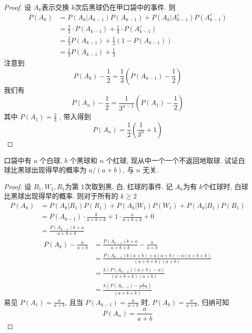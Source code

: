 \documentclass[../main.tex]{subfiles}
\begin{document}
\begin{proof}
    设 \(  A_{k}  \)表示交换 \(  k  \)次后黑球仍在甲口袋中的事件. 则 \[
   \begin{aligned}
    P\left( A_{k} \right)&= P\left( A_{k}|A_{k-1} \right)P\left( A_{k-1} \right)+ P\left( A_{k}|A_{k-1}^{c} \right)P\left( A_{k-1}^{c} \right)\\ 
     &=  \frac{2 }{3 }\cdot P\left( A_{k-1} \right)  + \frac{1 }{3 }\cdot P\left( A_{k-1}^{c} \right)  \\ 
      &= \frac{2 }{3 }P\left( A_{k-1} \right)+ \frac{1 }{3 }\left( 1-P\left( A_{k-1} \right)  \right)    \\ 
       &= \frac{1 }{3 }P\left( A_{k-1} \right)+ \frac{1 }{3 }   
   \end{aligned}     
    \]  注意到 \[
    P\left( A_{k} \right)-\frac{1 }{2 } =  \frac{1 }{3 }\left( P\left( A_{k-1} \right)-\frac{1 }{2}   \right)    
    \]我们有 \[
    P\left( A_{n} \right)-\frac{1 }{2 }= \frac{1 }{3^{n-1} }\left( P\left( A_{1} \right)-\frac{1 }{2 }   \right)    
    \]其中 \(  P\left( A_1 \right)= \frac{2 }{3 }    \) , 带入得到 \[
    P\left( A_{n} \right)=\frac{1 }{2 }\left( \frac{1 }{3^{n} }+ 1  \right)  
    \]
\end{proof}
\begin{exercise}{}{}
口袋中有 $a$ 个白球, $b$ 个黑球和 $n$ 个红球, 现从中一个一个不返回地取球. 试证白球比黑球出现得早的概率为 $a/(a+b)$, 与 $n$ 无关.
\end{exercise}

\begin{proof}
    设 \(  B_{1}, W_{1},R_{1}  \)为第 \(  1  \)次取到黑, 白, 红球的事件. 记 \(  A_{k}  \)为有 \(  k  \)个红球时, 白球比黑球出现得早的概率. 则对于所有的 \(  k\ge 2  \)  \[
   \begin{aligned}
    P\left( A_{k} \right)&= P\left( A_{k}|R_{1} \right)P\left( R_1 \right)+ P\left( A_{k}|W_{1} \right)P\left( W_{1} \right)+ P\left( A_{k}|B_1 \right)P\left( B_1 \right)\\ 
     &=        P\left( A_{k-1} \right)\cdot \frac{k }{a+ b+ k }+ 1\cdot \frac{a }{a+ b + k}+ 0\\ 
      &=     \frac{P\left( A_{k-1} \right)k+ a  }{a+ b+ k } 
   \end{aligned}
    \]   \[
  \begin{aligned}
    P\left( A_{k} \right)-\frac{a }{a+ b }&= \frac{P\left( A_{k-1} \right)k+ a  }{a+ b+ k}-\frac{a }{a+ b }   \\ 
     &= \frac{P\left( A_{k-1} \right)k\left( a+ b \right)+ a\left( a+ b \right)-a\left( a+ b+ k \right)     }{ \left( a+ b+ k \right)\left( a+ b \right)  }   \\ 
      &= \frac{k\left( P\left( A_{k-1} \right)\left( a+ b \right)-a   \right)  }{\left( a+ b+ k \right)\left( a+ b \right)   }\\ 
       &= \frac{k\left( P\left( A_{k-1} \right)-\frac{a }{a+ b }   \right)  }{\left( a+ b+ k \right)  }  
  \end{aligned}
    \]易见 \(  P\left( A_1 \right)= \frac{a }{a+ b }    \), 且当 \(  P\left( A_{k-1} \right)= \frac{a }{a+ b }    \)  时,  \(  P\left( A_{k} \right)  = \frac{a }{a+ b }  \), 归纳可知 \[
    P\left( A_{n} \right)= \frac{a }{a+ b }  
    \] 
\end{proof}
\end{document}
